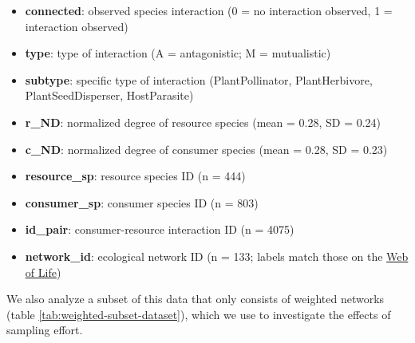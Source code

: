\documentclass[11pt,]{article}
\providecommand{\tightlist}{%
  \setlength{\itemsep}{0pt}\setlength{\parskip}{0pt}}
\begin{document}
\begin{itemize}
\tightlist
\item
  \textbf{connected}: observed species interaction (0 = no interaction
  observed, 1 = interaction observed)
\item
  \textbf{type}: type of interaction (A = antagonistic; M = mutualistic)
\item
  \textbf{subtype}: specific type of interaction (PlantPollinator,
  PlantHerbivore, PlantSeedDisperser, HostParasite)
\item
  \textbf{r\_ND}: normalized degree of resource species (mean = 0.28, SD
  = 0.24)
\item
  \textbf{c\_ND}: normalized degree of consumer species (mean = 0.28, SD
  = 0.23)
\item
  \textbf{resource\_sp}: resource species ID (n = 444)
\item
  \textbf{consumer\_sp}: consumer species ID (n = 803)
\item
  \textbf{id\_pair}: consumer-resource interaction ID (n = 4075)
\item
  \textbf{network\_id}: ecological network ID (n = 133; labels match
  those on the \href{http://www.web-of-life.es/}{Web of Life})
\end{itemize}

We also analyze a subset of this data that only consists of weighted
networks (table \ref{tab:weighted-subset-dataset}), which we use to
investigate the effects of sampling effort.
\end{document}

